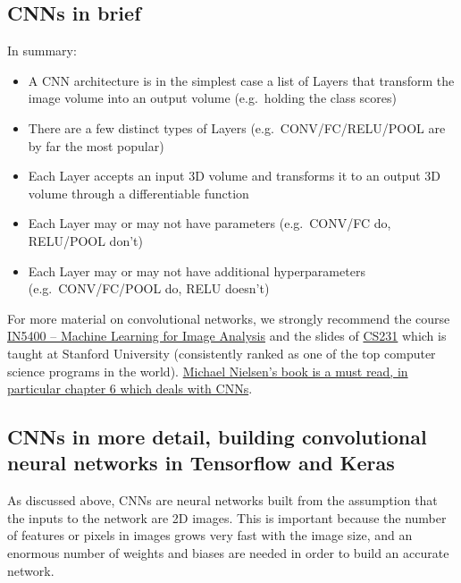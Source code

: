 \documentclass[%
oneside,                 %
final,                   %
10pt]{article}
\begin{document}
\subsection{CNNs in brief}

In summary:

\begin{itemize}
\item A CNN architecture is in the simplest case a list of Layers that transform the image volume into an output volume (e.g.~holding the class scores)

\item There are a few distinct types of Layers (e.g.~CONV/FC/RELU/POOL are by far the most popular)

\item Each Layer accepts an input 3D volume and transforms it to an output 3D volume through a differentiable function

\item Each Layer may or may not have parameters (e.g.~CONV/FC do, RELU/POOL don’t)

\item Each Layer may or may not have additional hyperparameters (e.g.~CONV/FC/POOL do, RELU doesn’t)
\end{itemize}

\noindent
For more material on convolutional networks, we strongly recommend
the course
\href{{https://www.uio.no/studier/emner/matnat/ifi/IN5400/index-eng.html}}{IN5400 – Machine Learning for Image Analysis}
and the slides of \href{{http://cs231n.github.io/convolutional-networks/}}{CS231} which is taught at Stanford University (consistently ranked as one of the top computer science programs in the world). \href{{http://neuralnetworksanddeeplearning.com/chap6.html}}{Michael Nielsen's book is a must read, in particular chapter 6 which deals with CNNs}.


\subsection{CNNs in more detail, building convolutional neural networks in Tensorflow and Keras}


As discussed above, CNNs are neural networks built from the assumption that the inputs
to the network are 2D images. This is important because the number of features or pixels in images
grows very fast with the image size, and an enormous number of weights and biases are needed in order to build an accurate network.  
\end{document}
